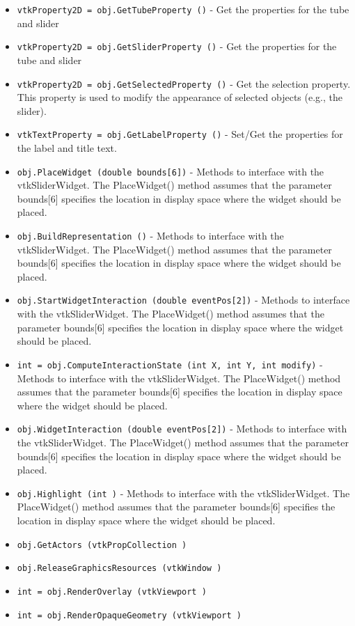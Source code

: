 \begin{itemize}
\item  \verb|vtkProperty2D = obj.GetTubeProperty ()| -  Get the properties for the tube and slider

\item  \verb|vtkProperty2D = obj.GetSliderProperty ()| -  Get the properties for the tube and slider

\item  \verb|vtkProperty2D = obj.GetSelectedProperty ()| -  Get the selection property. This property is used to modify the
 appearance of selected objects (e.g., the slider).

\item  \verb|vtkTextProperty = obj.GetLabelProperty ()| -  Set/Get the properties for the label and title text.

\item  \verb|obj.PlaceWidget (double bounds[6])| -  Methods to interface with the vtkSliderWidget. The PlaceWidget() method
 assumes that the parameter bounds[6] specifies the location in display
 space where the widget should be placed.

\item  \verb|obj.BuildRepresentation ()| -  Methods to interface with the vtkSliderWidget. The PlaceWidget() method
 assumes that the parameter bounds[6] specifies the location in display
 space where the widget should be placed.

\item  \verb|obj.StartWidgetInteraction (double eventPos[2])| -  Methods to interface with the vtkSliderWidget. The PlaceWidget() method
 assumes that the parameter bounds[6] specifies the location in display
 space where the widget should be placed.

\item  \verb|int = obj.ComputeInteractionState (int X, int Y, int modify)| -  Methods to interface with the vtkSliderWidget. The PlaceWidget() method
 assumes that the parameter bounds[6] specifies the location in display
 space where the widget should be placed.

\item  \verb|obj.WidgetInteraction (double eventPos[2])| -  Methods to interface with the vtkSliderWidget. The PlaceWidget() method
 assumes that the parameter bounds[6] specifies the location in display
 space where the widget should be placed.

\item  \verb|obj.Highlight (int )| -  Methods to interface with the vtkSliderWidget. The PlaceWidget() method
 assumes that the parameter bounds[6] specifies the location in display
 space where the widget should be placed.

\item  \verb|obj.GetActors (vtkPropCollection )|

\item  \verb|obj.ReleaseGraphicsResources (vtkWindow )|

\item  \verb|int = obj.RenderOverlay (vtkViewport )|

\item  \verb|int = obj.RenderOpaqueGeometry (vtkViewport )|

\end{itemize}
